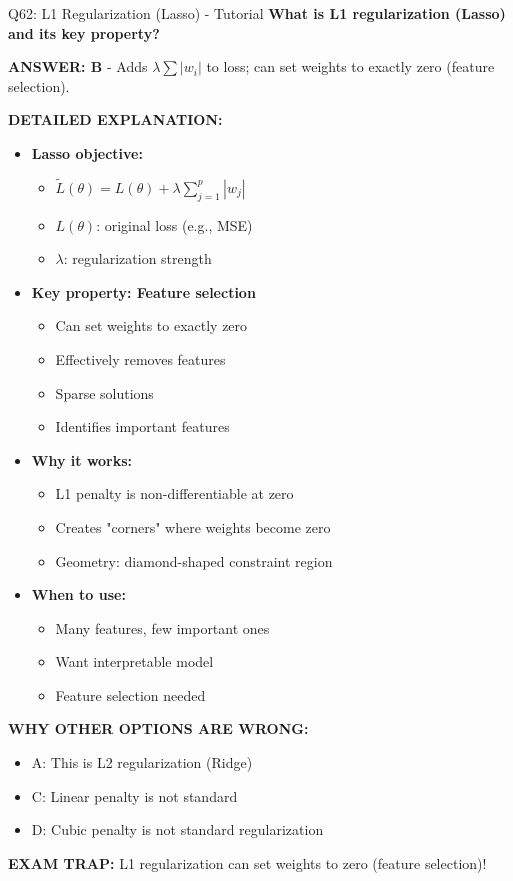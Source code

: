 \documentclass[8pt]{beamer}
\begin{document}
	\begin{frame}{Q62: L1 Regularization (Lasso) - Tutorial}
		\fontsize{6.5}{7.5}\selectfont
		\textbf{What is L1 regularization (Lasso) and its key property?}
		
		\vspace{0.05cm}
		\textcolor{myblue}{\textbf{ANSWER: B}} - Adds $\lambda \sum |w_i|$ to loss; can set weights to exactly zero (feature selection).
		
		\vspace{0.05cm}
		\textbf{DETAILED EXPLANATION:}
		\begin{itemize}
			\item \textbf{Lasso objective:}
			\begin{itemize}
				\item $\tilde{L}(\theta) = L(\theta) + \lambda \sum_{j=1}^p |w_j|$
				\item $L(\theta)$: original loss (e.g., MSE)
				\item $\lambda$: regularization strength
			\end{itemize}
			\item \textbf{Key property: Feature selection}
			\begin{itemize}
				\item Can set weights to exactly zero
				\item Effectively removes features
				\item Sparse solutions
				\item Identifies important features
			\end{itemize}
			\item \textbf{Why it works:}
			\begin{itemize}
				\item L1 penalty is non-differentiable at zero
				\item Creates "corners" where weights become zero
				\item Geometry: diamond-shaped constraint region
			\end{itemize}
			\item \textbf{When to use:}
			\begin{itemize}
				\item Many features, few important ones
				\item Want interpretable model
				\item Feature selection needed
			\end{itemize}
		\end{itemize}
		
		\vspace{0.05cm}
		\textcolor{myred}{\textbf{WHY OTHER OPTIONS ARE WRONG:}}
		\begin{itemize}
			\item \textcolor{myred}{A:} This is L2 regularization (Ridge)
			\item \textcolor{myred}{C:} Linear penalty is not standard
			\item \textcolor{myred}{D:} Cubic penalty is not standard regularization
		\end{itemize}
		
		\textcolor{myred}{\textbf{EXAM TRAP:}} L1 regularization can set weights to zero (feature selection)!
	\end{frame}
	
\end{document}
